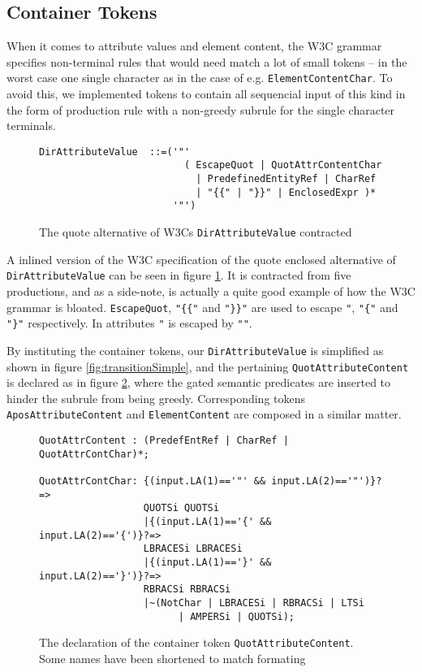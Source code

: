 \subsection{Container Tokens}
\label{sect:rewriteGrammar:containerTokens}
When it comes to attribute values and element content, the W3C grammar specifies non-terminal rules that would need match a lot of small tokens -- in the worst case one single character as in the case of e.g. \verb!ElementContentChar!. To avoid this, we implemented tokens to contain all sequencial input of this kind in the form of production rule with a non-greedy subrule for the single character terminals. 

\begin{figure}[h!]
\begin{Verbatim}
DirAttributeValue  ::=('"' 
                         ( EscapeQuot | QuotAttrContentChar
                           | PredefinedEntityRef | CharRef 
                           | "{{" | "}}" | EnclosedExpr )* 
                       '"')
\end{Verbatim}
\caption[W3Cs \texttt{DirAttributeValue} contracted]{The quote alternative of W3Cs \texttt{DirAttributeValue} contracted}
\label{fig:contractAttribute}
\end{figure}

A inlined version of the W3C specification of the quote enclosed alternative of \verb!DirAttributeValue! can be seen in figure \ref{fig:contractAttribute}. It is contracted from five productions, and as a side-note, is actually a quite good example of how the W3C grammar is bloated. \verb!EscapeQuot!, \verb!"{{"! and \verb!"}}"! are used to escape \verb!"!, \verb!"{"! and \verb!"}"! respectively. In attributes \verb!"! is escaped by \verb!""!. 

By instituting the container tokens, our \verb!DirAttributeValue! is simplified as shown in figure \ref{fig:transitionSimple}, and the pertaining \verb!QuotAttributeContent! is declared as in figure \ref{fig:containerToken}, where the gated semantic predicates are inserted to hinder the subrule from being greedy. Corresponding tokens \verb!AposAttributeContent! and \verb!ElementContent! are composed in a similar matter.

\begin{figure}[h!]
\begin{Verbatim}
QuotAttrContent : (PredefEntRef | CharRef | QuotAttrContChar)*;

QuotAttrContChar: {(input.LA(1)=='"' && input.LA(2)=='"')}?=> 
                  QUOTSi QUOTSi
                  |{(input.LA(1)=='{' && input.LA(2)=='{')}?=> 
                  LBRACESi LBRACESi 
                  |{(input.LA(1)=='}' && input.LA(2)=='}')}?=> 
                  RBRACSi RBRACSi 
                  |~(NotChar | LBRACESi | RBRACSi | LTSi 
                        | AMPERSi | QUOTSi);
\end{Verbatim}
\caption[Example of container token]{The declaration of the container token \texttt{QuotAttributeContent}. Some names have been shortened to match formating}
\label{fig:containerToken}
\end{figure}